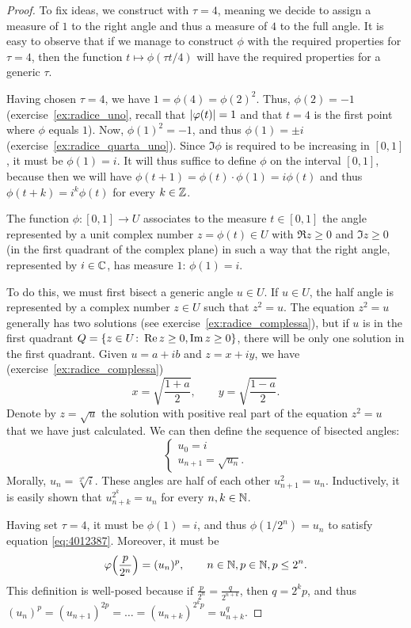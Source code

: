 \begin{proof}
To fix ideas, we construct with $\tau=4$, 
meaning we decide to assign a measure of $1$ to the right angle and 
thus a measure of $4$ to the full angle. 
It is easy to observe that if we manage to construct $\phi$ with the required
properties for $\tau=4$, then the function $t\mapsto \phi(\tau t / 4)$
will have the required properties for a generic $\tau$.

Having chosen $\tau=4$, we have $1 = \phi(4) = \phi(2)^2$. 
Thus, $\phi(2)=-1$ (exercise~\ref{ex:radice_uno}, 
recall that ${\left|\varphi(t)\right|}=1$ and that $t=4$ 
is the first point where $\phi$ equals $1$).
Now, $\phi(1)^2=-1$, and thus $\phi(1)=\pm i$
(exercise~\ref{ex:radice_quarta_uno}).
Since $\Im \phi$ is required to be increasing in $[0,1]$, it must be
$\phi(1)=i$. 
It will thus suffice to define $\phi$ on the interval $[0,1]$, 
because then we will have $\phi(t+1)=\phi(t)\cdot \phi(1) = i\phi(t)$
and thus $\phi(t+k)=i^k\phi(t)$ for every $k\in {\mathbb Z}$.

The function $\phi\colon[0,1]\to U$
associates to the measure $t\in[0,1]$ the angle represented by 
a unit complex number $z=\phi(t)\in U$ with $\Re z\ge 0$ and $\Im z\ge 0$
(in the first quadrant of the complex plane) in such a way 
that the right angle, represented by $i\in {\mathbb C}$, has measure $1$: $\phi(1)=i$.

To do this, we must first bisect a generic angle 
$u\in U$.
If $u\in U$, the half angle is represented by a complex 
number $z\in U$ such that $z^2=u$. 
The equation $z^2=u$ generally has two solutions (see
exercise~\ref{ex:radice_complessa}),
but if $u$ 
is in the first quadrant $Q={\left\{ z\in U\colon \operatorname{Re} z\ge 0, \operatorname{Im} z\ge 0 \right\}}$,
there will be only one solution in the first quadrant.
Given $u=a+ib$ and $z=x+iy$, we have (exercise~\ref{ex:radice_complessa})
\[
  x = \sqrt{\frac{1+a}{2}}, \qquad 
  y = \sqrt{\frac{1-a}{2}}.
\]
Denote by $z=\sqrt u$ the solution with positive real part 
of the equation $z^2=u$ that we have just calculated.
We can then define the sequence of bisected angles:
\[
\begin{cases}
u_0 = i\\
u_{n+1} = \sqrt{u_n}.
\end{cases}
\]
Morally, $u_n = \sqrt[2^n] i$.
These angles are half of each other $u_{n+1}^2 = u_n$.
Inductively, it is easily shown that $u_{n+k}^{2^k} = u_n$
for every $n,k\in {\mathbb N}$.

Having set $\tau=4$, it must be $\phi(1)=i$, and thus 
$\phi(1/2^n)=u_n$ to satisfy equation \eqref{eq:4012387}.
Moreover, it must be
\begin{equation}
\varphi{\left( \frac{p}{2^n} \right)} = (u_n)^p,
\qquad n\in {\mathbb N}, p\in {\mathbb N}, p\le 2^n.
\end{equation}
This definition is well-posed because if $\frac{p}{2^n}=\frac{q}{2^{n+k}}$,
then $q=2^k p$, and thus 
$(u_n)^p = (u_{n+1})^{2p} = \dots = (u_{n+k})^{2^k p} = 
u_{n+k}^q$.


\end{proof}
